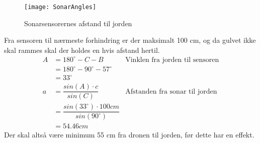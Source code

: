 \documentclass[Main]{subfiles}
\begin{document}
\begin{figure}[H]
\centering
	\texttt{[image: SonarAngles]}
	\caption{Sonarsensorernes afstand til jorden}
	\label{Fig:SonarAngles}
\end{figure}
Fra sensoren til nærmeste forhindring er der maksimalt 100 cm, og da gulvet ikke skal rammes skal der holdes en hvis afstand hertil.
\vspace{-10 pt}
\begin{align*}
A &= 180^\circ - C - B & \text{Vinklen fra jorden til sensoren}\\
	&= 180^\circ - 90^\circ - 57^\circ\\
	&= 33 ^\circ\\
a &= \dfrac{sin(A) \cdot c}{sin(C)} & \text{Afstanden fra sonar til jorden}\\
 	&= \dfrac{sin(33^\circ) \cdot 100cm}{sin(90^\circ)} \\
	&= 54.46 cm
\end{align*}
Der skal altså være minimum 55 cm fra dronen til jorden, før dette har en effekt.
\end{document}
